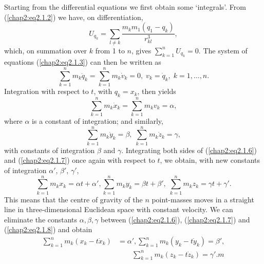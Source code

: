 Starting from the differential equations we first obtain some `integrals'. From (\ref{chap2:eq2.1.2}) we have, on differentiation,
$$
U_{q_k} = \sum\limits_{l \neq k} \frac{m_k m_1(q_1 - q_k)}{r^3_{kl}}, 
$$
which, on summation over $k$ from 1 to $n$, gives $\sum\limits^n_{k=1} U_{q_k} = 0$.
The system of equations (\ref{chap2:eq2.1.3}) can then be written as 
$$
\sum\limits^n_{k=1} m_k \ddot{q}_k = \sum\limits^n_{k=1} m_k \dot{v}_k =0, \; v_k = \dot{q}_k, \; k =1, \ldots,n.
$$\pageoriginale
Integration with respect to $t$, with $q_k = x_k$, then yields
\begin{equation*}
\sum\limits^n_{k=1} m_k \dot{x}_k= \sum\limits^n_{k=1} m_k v_k = \alpha, \tag{2.1.6}\label{chap2:eq2.1.6} 
\end{equation*}
where $\alpha $ is a constant of integration; and similarly,
\begin{equation*}
\sum\limits^n_{k=1} m_k \dot{y}_k = \beta, \; \sum\limits^n_{k=1} m_k \dot{z}_k =\gamma, 
\tag{2.1.7}\label{chap2:eq2.1.7} 
\end{equation*}
with constants of integration $\beta$ and $\gamma$. Integrating both sides of (\ref{chap2:eq2.1.6}) and (\ref{chap2:eq2.1.7}) once again with respect to $t$, we obtain, with new constants of integration $\alpha'$, $\beta'$, $\gamma'$,
\begin{equation*}
\sum\limits^n_{k=1} m_k x_k = \alpha t+ \alpha', \sum\limits^n_{k=1} m_k y_k = \beta t + \beta' , \; \sum\limits^n_{k=1} m_k z_k = \gamma t + \gamma'. \tag{2.1.8}\label{chap2:eq2.1.8} 
\end{equation*}
This means that the centre of gravity of the $n$ point-masses moves in a straight line in three-dimensional Euclidean space with constant velocity. We can eliminate the constants $\alpha, \beta, \gamma$ between (\ref{chap2:eq2.1.6}), (\ref{chap2:eq2.1.7}) and (\ref{chap2:eq2.1.8}) and obtain
\begin{align*}
\sum\limits^n_{k=1} m_k (x_k - t\dot{x}_k) & = \alpha', \sum\limits^n_{k=1} m_k (y_k - t\dot{y}_k)  = \beta', \\
& \qquad \sum\limits^n_{k=1} m_k (z_k - t\dot{z}_k) = \gamma'. m \tag{2.1.9}\label{chap2:eq2.1.9} 
\end{align*}

